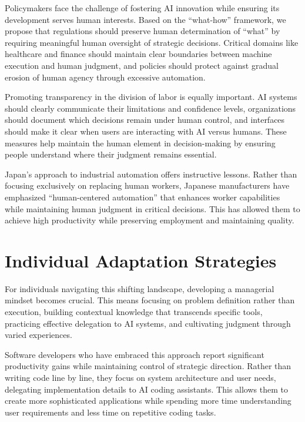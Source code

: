 \documentclass[
  Letterpaper,
]{scrbook}
\begin{document}
Policymakers face the challenge of fostering AI innovation while
ensuring its development serves human interests. Based on the
``what-how'' framework, we propose that regulations should preserve
human determination of ``what'' by requiring meaningful human oversight
of strategic decisions. Critical domains like healthcare and finance
should maintain clear boundaries between machine execution and human
judgment, and policies should protect against gradual erosion of human
agency through excessive automation.

Promoting transparency in the division of labor is equally important. AI
systems should clearly communicate their limitations and confidence
levels, organizations should document which decisions remain under human
control, and interfaces should make it clear when users are interacting
with AI versus humans. These measures help maintain the human element in
decision-making by ensuring people understand where their judgment
remains essential.

Japan's approach to industrial automation offers instructive lessons.
Rather than focusing exclusively on replacing human workers, Japanese
manufacturers have emphasized ``human-centered automation'' that
enhances worker capabilities while maintaining human judgment in
critical decisions. This has allowed them to achieve high productivity
while preserving employment and maintaining quality.

\section{Individual Adaptation
Strategies}\label{individual-adaptation-strategies}

For individuals navigating this shifting landscape, developing a
managerial mindset becomes crucial. This means focusing on problem
definition rather than execution, building contextual knowledge that
transcends specific tools, practicing effective delegation to AI
systems, and cultivating judgment through varied experiences.

Software developers who have embraced this approach report significant
productivity gains while maintaining control of strategic direction.
Rather than writing code line by line, they focus on system architecture
and user needs, delegating implementation details to AI coding
assistants. This allows them to create more sophisticated applications
while spending more time understanding user requirements and less time
on repetitive coding tasks.
\end{document}
